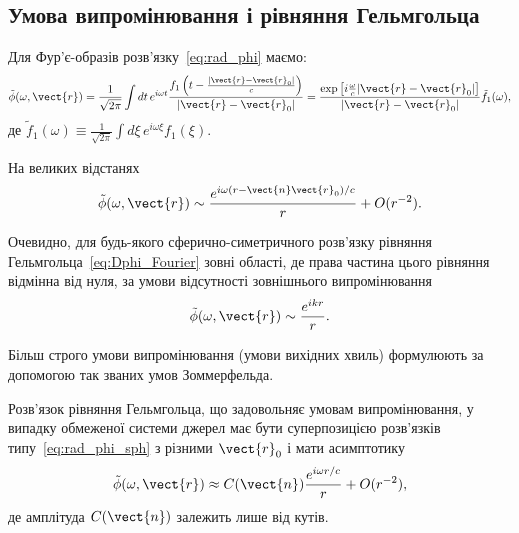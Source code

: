\subsection*{Умова випромінювання і рівняння Гельмгольца}


Для Фур'є-обра\-зів розв'язку~\eqref{eq:rad_phi} маємо:
\begin{equation}
	\tilde{\phi} (\omega, \vect{r}) = \frac{1}{\sqrt{2\pi}} \int dt \, e^{i\omega t} \frac{f_1\left(t - \frac{|\vect{r} - \vect{r}_0|}{c}\right)}{|\vect{r} - \vect{r}_0|}  =
	\frac{\exp \left[ i \frac{\omega}{c} |\vect{r} - \vect{r}_0| \right] }{|\vect{r} - \vect{r}_0|}\tilde{f}_1(\omega),
\end{equation}
де
\(
\tilde{f}_1 (\omega) \equiv \frac{1}{\sqrt{2\pi}} \int d\xi \, e^{i\omega \xi} f_1(\xi).
\)

На великих відстанях
\begin{equation*}
	\tilde{\phi} (\omega, \vect{r}) \sim \frac{e^{i\omega (r - \vect{n} \vect{r}_0)/c}}{r} + O(r^{-2}).
\end{equation*}

Очевидно, для будь-якого сферично-симетричного розв'язку рівняння Гельмгольца~\eqref{eq:Dphi_Fourier} зовні області, де
права частина цього рівняння відмінна від нуля, за умови відсутності зовнішнього випромінювання
\begin{equation}\label{eq:rad_phi_sph}
	\tilde{\phi} (\omega, \vect{r}) \sim \frac{e^{ikr}}{r}.
\end{equation}

Більш строго умови випромінювання (умови вихідних хвиль) формулюють за допомогою так званих умов Зоммерфельда.

Розв'язок рівняння Гельмгольца, що задовольняє умовам випромінювання, у випадку обмеженої системи джерел має бути
суперпозицією розв'язків типу~\eqref{eq:rad_phi_sph} з різними $\vect{r}_0$ і мати асимптотику
\begin{equation*}
	\tilde{\phi} (\omega, \vect{r}) \approx C(\vect{n}) \frac{e^{i\omega r / c}}{r} + O(r^{-2}),
\end{equation*}
де амплітуда $C(\vect{n}) $ залежить лише від кутів.


